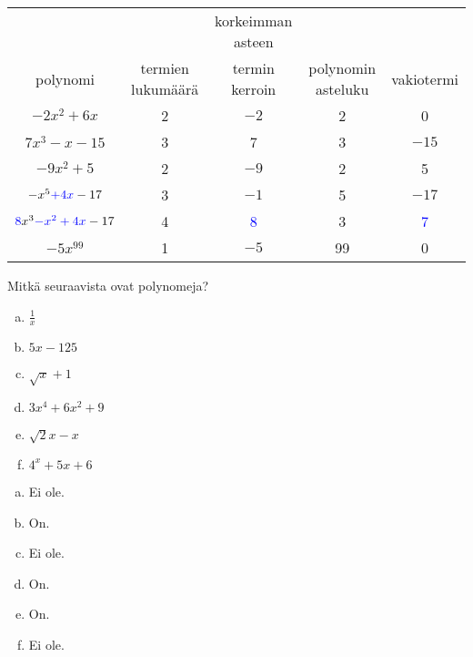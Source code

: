 \begin{tehtava}
\begin{vastaus}
    \begin{tabular}{|c|c|c|c|c|}
                                                                                           \hline
             &                   & korkeimman asteen &                     &            \\
polynomi     & termien lukumäärä & termin kerroin    & polynomin asteluku  & vakiotermi \\ \hline
$-2x^2+6x$   &        2          &         $-2$      &       2             &    0       \\ \hline 
$7x^3-x-15$  &        3          &           7       &       3             &    $-15$   \\ \hline 
$-9x^2+5$    &        2          &          $-9$     &       2             &    5       \\ \hline 
$-x^5\textcolor{blue}{+4x}-17$%
             &        3          &          $-1$     &       5             &    $-17$   \\ \hline 
$\textcolor{blue}{8}x^3\textcolor{blue}{-x^2+4x}-17$%
             &        4          &\textcolor{blue}{8}  &       3             &\textcolor{blue}{7}\\ \hline 
$-5x^{99}$   &        1          &          $-5$     &       99            &         0      \\ \hline                           
     \end{tabular}
     \end{vastaus}
\end{tehtava}



\begin{tehtava}
    Mitkä seuraavista ovat polynomeja?
    \begin{enumerate}[a)]
        \item $\frac{1}{x}$
        \item $5x-125$
        \item $\sqrt{x}+1$
        \item $3x^4+6x^2+9$
        \item $\sqrt{2}x-x$
        \item $4^x+5x+6$
    \end{enumerate}
    \begin{vastaus}
        \begin{enumerate}[a)]
            \item Ei ole.
            \item On.
            \item Ei ole.
            \item On.
            \item On.
            \item Ei ole.
        \end{enumerate}
    \end{vastaus}
\end{tehtava}

